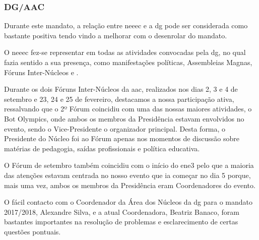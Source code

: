 
\subsubsection{DG/AAC}

Durante este mandato, a relação entre \acrshort{neeec} e a \acrshort{dg} pode ser considerada como bastante positiva tendo vindo a melhorar com o desenrolar do mandato.

O \acrshort{neeec} fez-se representar em todas as atividades convocadas pela \acrshort{dg}, no qual fazia sentido a sua presença, como manifestações políticas, Assembleias Magnas, Fóruns Inter-Núcleos e .
  
Durante os dois Fóruns Inter-Núcleos da \acrshort{aac}, realizados nos dias 2, 3 e 4 de setembro e 23, 24 e 25 de fevereiro, destacamos a nossa participação ativa, ressalvando que o 2º Fórum coincidiu com uma das nossas maiores atividades, o Bot Olympics, onde ambos os membros da Presidência estavam envolvidos no evento, sendo o Vice-Presidente o organizador principal. Desta forma, o Presidente do Núcleo foi ao Fórum apenas nos momentos de discussão sobre matérias de pedagogia, saídas profissionais e política educativa.

O Fórum de setembro também coincidiu com o início do \acrshort{ene3} pelo que a maioria das atenções estavam centrada no nosso evento que ia começar no dia 5 porque, mais uma vez, ambos os membros da Presidência eram Coordenadores do evento.

O fácil contacto com o Coordenador da Área dos Núcleos da \acrshort{dg} para o mandato 2017/2018, Alexandre Silva, e a atual Coordenadora, Beatriz Banaco, foram bastantes importantes na resolução de problemas e esclarecimento de certas questões pontuais.
